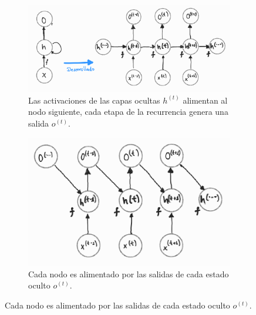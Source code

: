 \begin{figure}[!ht]
    \centering
    \begin{subfigure}[b]{0.49\textwidth}
        \centering
        \includegraphics[width=\textwidth]{Chapters/1. Transformer/Figures/rnn/rnn_cfga.png}
        \caption{Las activaciones de las capas ocultas $h^{(t)}$
        alimentan al nodo siguiente, cada etapa de la recurrencia genera una salida $o^{(t)}$.}
        \label{fig:rnn_cfga}
    \end{subfigure}
    \hfill
    \begin{subfigure}[b]{0.4\textwidth}
        \centering
        \includegraphics[width=\textwidth]{Chapters/1. Transformer/Figures/rnn/rnn_cfgb.png}
        \caption{Cada nodo es alimentado por las salidas de cada estado oculto $o^{(t)}$.}
        \label{fig:rnn_cfgb}
    \end{subfigure}


\end{figure}
